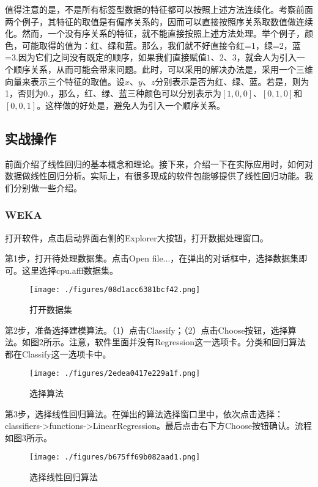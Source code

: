 值得注意的是，不是所有标签型数据的特征都可以按照上述方法连续化。考察前面两个例子，其特征的取值是有偏序关系的，因而可以直接按照序关系取数值做连续化。然而，一个没有序关系的特征，就不能直接按照上述方法处理。举个例子，颜色，可能取得的值为：红、绿和蓝。那么，我们就不好直接令红=1，绿=2，蓝=3.因为它们之间没有既定的顺序，如果我们直接赋值$1$、$2$、$3$，就会人为引入一个顺序关系，从而可能会带来问题。此时，可以采用的解决办法是，采用一个三维向量来表示三个特征的取值。设$x$、$y$、$z$分别表示是否为红、绿、蓝。若是，则为1，否则为0.，那么，红、绿、蓝三种颜色可以分别表示为$[1,0,0]$、$[0,1,0]$和$[0,0,1]$。这样做的好处是，避免人为引入一个顺序关系。

\subsection{实战操作}

前面介绍了线性回归的基本概念和理论。接下来，介绍一下在实际应用时，如何对数据做线性回归分析。实际上，有很多现成的软件包能够提供了线性回归功能。我们分别做一些介绍。

\subsubsection{WEKA}


打开软件，点击启动界面右侧的Explorer大按钮，打开数据处理窗口。

第1步，打开待处理数据集。点击Open file...，在弹出的对话框中，选择数据集即可。这里选择cpu.afff数据集。
\begin{figure}[ht]
\centering
\texttt{[image: ./figures/08d1acc6381bcf42.png]}
\caption{打开数据集} \label{fig_LiGr_5}
\end{figure}

第2步，准备选择建模算法。（1）点击Classify；（2）点击Choose按钮，选择算法。如图2所示。注意，软件里面并没有Regression这一选项卡。分类和回归算法都在Classify这一选项卡中。
\begin{figure}[ht]
\centering
\texttt{[image: ./figures/2edea0417e229a1f.png]}
\caption{选择算法} \label{fig_LiGr_2}
\end{figure}

第3步，选择线性回归算法。在弹出的算法选择窗口里中，依次点击选择：classifiers->functions->LinearRegression。最后点击右下方Choose按钮确认。流程如图3所示。
\begin{figure}[ht]
\centering
\texttt{[image: ./figures/b675ff69b082aad1.png]}
\caption{选择线性回归算法} \label{fig_LiGr_3}
\end{figure}

